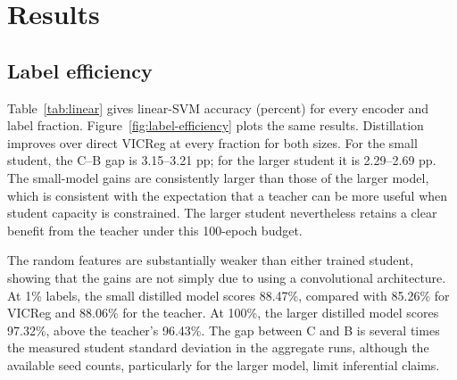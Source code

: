 \documentclass[10pt]{article}
\begin{document}
\section{Results}

\subsection{Label efficiency}

Table~\ref{tab:linear} gives linear-SVM accuracy (percent) for every
encoder and label fraction. Figure~\ref{fig:label-efficiency} plots the
same results. Distillation improves over direct VICReg at every fraction
for both sizes. For the small student, the C--B gap is 3.15--3.21 pp; for
the larger student it is 2.29--2.69 pp. The small-model gains are
consistently larger than those of the larger model, which is consistent
with the expectation that a teacher can be more useful when student
capacity is constrained. The larger student nevertheless retains a clear
benefit from the teacher under this 100-epoch budget.

The random features are substantially weaker than either trained student,
showing that the gains are not simply due to using a convolutional
architecture. At 1\% labels, the small distilled model scores 88.47\%,
compared with 85.26\% for VICReg and 88.06\% for the teacher. At 100\%,
the larger distilled model scores 97.32\%, above the teacher's 96.43\%.
The gap between C and B is several times the measured student standard
deviation in the aggregate runs, although the available seed counts,
particularly for the larger model, limit inferential claims.
\end{document}
